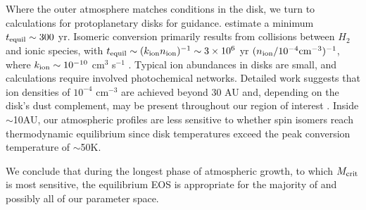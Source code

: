 Where the outer atmosphere matches conditions in the disk, we turn to calculations for protoplanetary disks for guidance.  \citet{boley07}  estimate a minimum $t_{\rm equil} \sim 300$ yr.  Isomeric conversion primarily results from collisions between $H_2$ and ionic species, with $t_{\rm equil} \sim (k_{\rm ion} n_{\rm ion})^{-1} \sim 3\times 10^6$ yr $(n_{\rm ion}/10^{-4} {\rm cm}^{-3})^{-1}$, where $k_{\rm ion} \sim 10^{-10}$ cm$^3$ s$^{-1}$ \cite{walmsley04}.  Typical ion abundances in disks are small, and calculations require involved photochemical networks. 
Detailed work suggests that ion densities of $10^{-4}$ cm$^{-3}$ are achieved beyond 30 AU and, depending on the disk's dust complement, may be present throughout our region of interest \citep[e.g.,][]{glassgold97,bai09, turner10, perez11}. 
Inside $\sim$10AU, our atmospheric profiles are less sensitive to whether spin isomers reach thermodynamic equilibrium since disk temperatures exceed the peak conversion temperature of $\sim$50K.

We conclude that during the longest phase of atmospheric growth, to which $M_{\rm crit}$ is most sensitive, the equilibrium EOS is appropriate for the majority of and possibly all of our parameter space.




